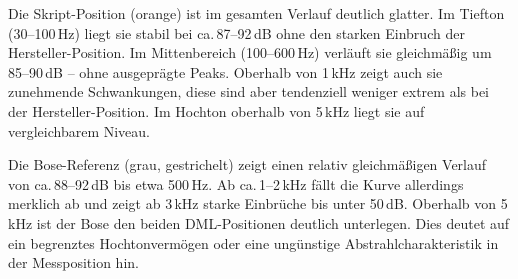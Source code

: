 Die Skript-Position (orange) ist im gesamten Verlauf deutlich glatter. Im Tiefton (30--100\,Hz) liegt sie stabil bei ca.\,87--92\,dB ohne den starken Einbruch der Hersteller-Position. Im Mittenbereich (100--600\,Hz) verläuft sie gleichmäßig um 85--90\,dB -- ohne ausgeprägte Peaks. Oberhalb von 1\,kHz zeigt auch sie zunehmende Schwankungen, diese sind aber tendenziell weniger extrem als bei der Hersteller-Position. Im Hochton oberhalb von 5\,kHz liegt sie auf vergleichbarem Niveau.

Die Bose-Referenz (grau, gestrichelt) zeigt einen relativ gleichmäßigen Verlauf von ca.\,88--92\,dB bis etwa 500\,Hz. Ab ca.\,1--2\,kHz fällt die Kurve allerdings merklich ab und zeigt ab 3\,kHz starke Einbrüche bis unter 50\,dB. Oberhalb von 5\,kHz ist der Bose den beiden DML-Positionen deutlich unterlegen. Dies deutet auf ein begrenztes Hochtonvermögen oder eine ungünstige Abstrahlcharakteristik in der Messposition hin.

